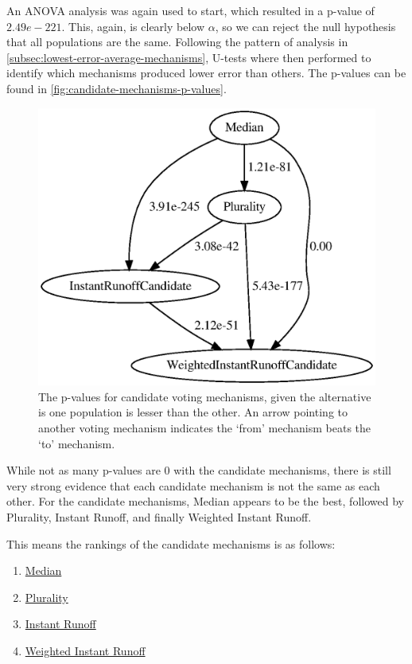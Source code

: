 An ANOVA analysis was again used to start, which resulted in a p-value of
$2.49e-221$.
This, again, is clearly below $\alpha$, so we can reject the null hypothesis that all
populations are the same.
Following the pattern of analysis in
\autoref{subsec:lowest-error-average-mechanisms}, U-tests where then performed to
identify which mechanisms produced lower error than others.
The p-values can be found in \autoref{fig:candidate-mechanisms-p-values}.

\begin{figure}[htbp]
    \centering
    \includegraphics[scale=0.75]
    {./content/figures/candidate-mechanisms-p-values.gv}
    \caption{The p-values for candidate voting mechanisms, given the alternative is one
    population is lesser than the other.
    An arrow pointing to another voting mechanism indicates the `from' mechanism
    beats the `to' mechanism.}
    \label{fig:candidate-mechanisms-p-values}
\end{figure}

While not as many p-values are 0 with the candidate mechanisms, there is still very
strong evidence that each candidate mechanism is not the same as each other.
For the candidate mechanisms, Median appears to be the best, followed
by Plurality, Instant Runoff, and finally Weighted Instant Runoff.
\begin{samepage}
    This means the rankings of the candidate mechanisms is as follows:
    \begin{enumerate}
        \item \hyperref[para:median]{Median}
        \item \hyperref[para:plurality]{Plurality}
        \item \hyperref[para:cand-instant-runoff]{Instant Runoff}
        \item \hyperref[para:cand-weighted-instant-runoff]{Weighted Instant Runoff}
    \end{enumerate}
\end{samepage}


